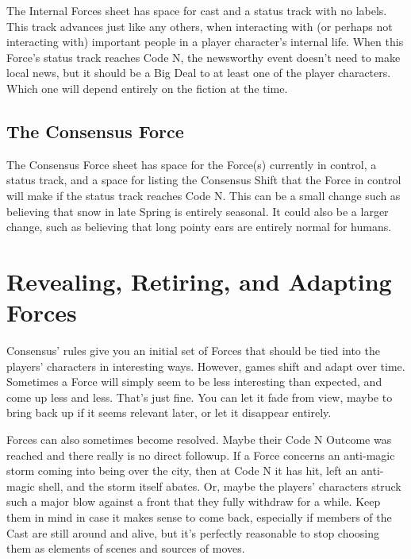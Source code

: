 \documentclass[
]{memoir}
\begin{document}
The Internal Forces sheet has space for cast and a status track with no
labels. This track advances just like any others, when interacting with
(or perhaps not interacting with) important people in a player
character's internal life. When this Force's status track reaches Code
N, the newsworthy event doesn't need to make local news, but it should
be a Big Deal to at least one of the player characters. Which one will
depend entirely on the fiction at the time.

\hypertarget{the-consensus-force}{%
\subsection{The Consensus Force}\label{the-consensus-force}}

The Consensus Force sheet has space for the Force(s) currently in
control, a status track, and a space for listing the Consensus Shift
that the Force in control will make if the status track reaches Code N.
This can be a small change such as believing that snow in late Spring is
entirely seasonal. It could also be a larger change, such as believing
that long pointy ears are entirely normal for humans.

\hypertarget{revealing-retiring-and-adapting-forces}{%
\section{Revealing, Retiring, and Adapting
Forces}\label{revealing-retiring-and-adapting-forces}}

Consensus' rules give you an initial set of Forces that should be tied
into the players' characters in interesting ways. However, games shift
and adapt over time. Sometimes a Force will simply seem to be less
interesting than expected, and come up less and less. That's just fine.
You can let it fade from view, maybe to bring back up if it seems
relevant later, or let it disappear entirely.

Forces can also sometimes become resolved. Maybe their Code N Outcome
was reached and there really is no direct followup. If a Force concerns
an anti-magic storm coming into being over the city, then at Code N it
has hit, left an anti-magic shell, and the storm itself abates. Or,
maybe the players' characters struck such a major blow against a front
that they fully withdraw for a while. Keep them in mind in case it makes
sense to come back, especially if members of the Cast are still around
and alive, but it's perfectly reasonable to stop choosing them as
elements of scenes and sources of moves.
\end{document}
